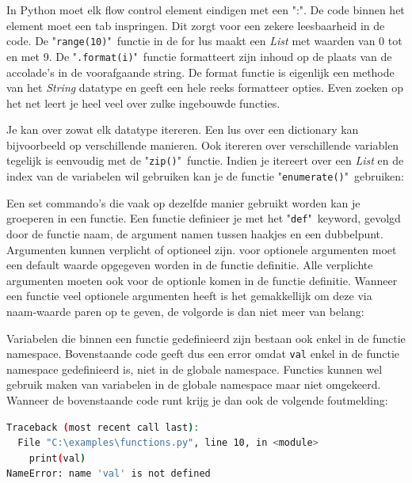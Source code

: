 \documentclass[11pt,twoside]{article}
\begin{document}
In Python moet elk flow control element eindigen met een ":". De code binnen het element moet een tab inspringen. Dit zorgt voor een zekere leesbaarheid in de code. De "\lstinline{range(10)}"\ functie in de for lus maakt een \emph{List} met waarden van 0 tot en met 9. De "\lstinline{.format(i)}"\ functie formatteert zijn inhoud op de plaats van de accolade's in de voorafgaande string. De format functie is eigenlijk een methode van het \emph{String} datatype en geeft een hele reeks formatteer opties. Even zoeken op het net leert je heel veel over zulke ingebouwde functies.

Je kan over zowat elk datatype itereren. Een lus over een dictionary kan bijvoorbeeld op verschillende manieren. Ook itereren over verschillende variablen tegelijk is eenvoudig met de "\lstinline{zip()}"\ functie. Indien je itereert over een \emph{List} en de index van de variabelen wil gebruiken kan je de functie "\lstinline{enumerate()}"\ gebruiken:


Een set commando's die vaak op dezelfde manier gebruikt worden kan je groeperen in een functie. Een functie definieer je met het "\lstinline{def}"\ keyword, gevolgd door de functie naam, de argument namen tussen haakjes en een dubbelpunt. Argumenten kunnen verplicht of optioneel zijn. voor optionele argumenten moet een default waarde opgegeven worden in de functie definitie. Alle verplichte argumenten moeten ook voor de optionle komen in de functie definitie. Wanneer een functie veel optionele argumenten heeft is het gemakkellijk om deze via naam-waarde paren op te geven, de volgorde is dan niet meer van belang:


Variabelen die binnen een functie gedefinieerd zijn bestaan ook enkel in de functie namespace. Bovenstaande code geeft dus een error omdat \lstinline{val} enkel in de functie namespace gedefinieerd is, niet in de globale namespace. Functies kunnen wel gebruik maken van variabelen in de globale namespace maar niet omgekeerd. Wanneer de bovenstaande code runt krijg je dan ook de volgende foutmelding:
\begin{lstlisting}[language=bash]
Traceback (most recent call last):
  File "C:\examples\functions.py", line 10, in <module>
    print(val)
NameError: name 'val' is not defined
\end{lstlisting}
\end{document}
